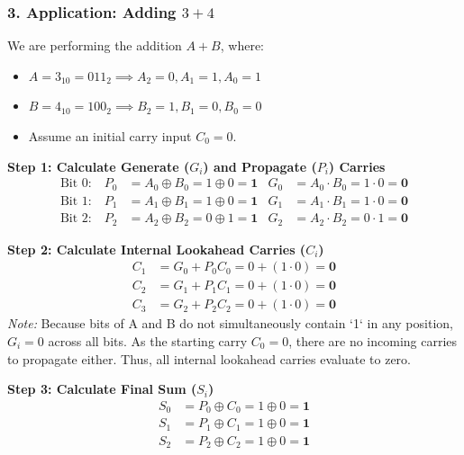 \documentclass[12pt,a3paper]{article}
\begin{document}
\begin{enumerate}
\begin{tcolorbox}[enhanced,breakable,ansbox,colback=cD!4,colframe=cD,boxrule=0.8pt,arc=5pt,title={\textbf{Answer}},fonttitle=\bfseries\color{white},colbacktitle=cD]
\vspace{0.3cm}
\subsubsection*{3. Application: Adding $3 + 4$}
We are performing the addition $A + B$, where:
\begin{itemize}
    \item $A = 3_{10} = 011_2 \implies A_2=0, A_1=1, A_0=1$
    \item $B = 4_{10} = 100_2 \implies B_2=1, B_1=0, B_0=0$
    \item Assume an initial carry input $C_0 = 0$.
\end{itemize}

\textbf{Step 1: Calculate Generate ($G_i$) and Propagate ($P_i$) Carries}
\begin{align*}
    \text{Bit 0:} \quad P_0 &= A_0 \oplus B_0 = 1 \oplus 0 = \mathbf{1} & G_0 &= A_0 \cdot B_0 = 1 \cdot 0 = \mathbf{0} \\
    \text{Bit 1:} \quad P_1 &= A_1 \oplus B_1 = 1 \oplus 0 = \mathbf{1} & G_1 &= A_1 \cdot B_1 = 1 \cdot 0 = \mathbf{0} \\
    \text{Bit 2:} \quad P_2 &= A_2 \oplus B_2 = 0 \oplus 1 = \mathbf{1} & G_2 &= A_2 \cdot B_2 = 0 \cdot 1 = \mathbf{0} 
\end{align*}

\textbf{Step 2: Calculate Internal Lookahead Carries ($C_i$)}
\begin{align*}
    C_1 &= G_0 + P_0C_0 = 0 + (1 \cdot 0) = \mathbf{0} \\
    C_2 &= G_1 + P_1C_1 = 0 + (1 \cdot 0) = \mathbf{0} \\
    C_3 &= G_2 + P_2C_2 = 0 + (1 \cdot 0) = \mathbf{0} 
\end{align*}
\textit{Note:} Because bits of A and B do not simultaneously contain `1` in any position, $G_i=0$ across all bits. As the starting carry $C_0=0$, there are no incoming carries to propagate either. Thus, all internal lookahead carries evaluate to zero.

\textbf{Step 3: Calculate Final Sum ($S_i$)}
\begin{align*}
    S_0 &= P_0 \oplus C_0 = 1 \oplus 0 = \mathbf{1} \\
    S_1 &= P_1 \oplus C_1 = 1 \oplus 0 = \mathbf{1} \\
    S_2 &= P_2 \oplus C_2 = 1 \oplus 0 = \mathbf{1} 
\end{align*}


\end{tcolorbox}
\end{enumerate}
\end{document}
